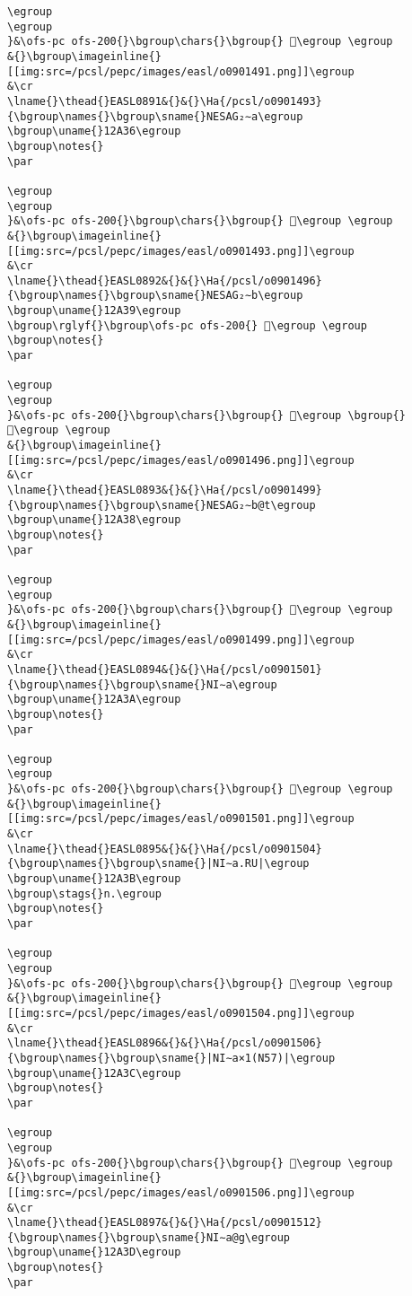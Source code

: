 \begin{verbatim}
\egroup
\egroup
}&\ofs-pc ofs-200{}\bgroup\chars{}\bgroup{} 𒨵\egroup \egroup
&{}\bgroup\imageinline{}[[img:src=/pcsl/pepc/images/easl/o0901491.png]]\egroup
&\cr
\lname{}\thead{}EASL0891&{}&{}\Ha{/pcsl/o0901493}{\bgroup\names{}\bgroup\sname{}NESAG₂∼a\egroup
\bgroup\uname{}12A36\egroup
\bgroup\notes{}
\par 

\egroup
\egroup
}&\ofs-pc ofs-200{}\bgroup\chars{}\bgroup{} 𒨶\egroup \egroup
&{}\bgroup\imageinline{}[[img:src=/pcsl/pepc/images/easl/o0901493.png]]\egroup
&\cr
\lname{}\thead{}EASL0892&{}&{}\Ha{/pcsl/o0901496}{\bgroup\names{}\bgroup\sname{}NESAG₂∼b\egroup
\bgroup\uname{}12A39\egroup
\bgroup\rglyf{}\bgroup\ofs-pc ofs-200{} 𒨹\egroup \egroup
\bgroup\notes{}
\par 

\egroup
\egroup
}&\ofs-pc ofs-200{}\bgroup\chars{}\bgroup{} 𒨷\egroup \bgroup{} 𒨹\egroup \egroup
&{}\bgroup\imageinline{}[[img:src=/pcsl/pepc/images/easl/o0901496.png]]\egroup
&\cr
\lname{}\thead{}EASL0893&{}&{}\Ha{/pcsl/o0901499}{\bgroup\names{}\bgroup\sname{}NESAG₂∼b@t\egroup
\bgroup\uname{}12A38\egroup
\bgroup\notes{}
\par 

\egroup
\egroup
}&\ofs-pc ofs-200{}\bgroup\chars{}\bgroup{} 𒨸\egroup \egroup
&{}\bgroup\imageinline{}[[img:src=/pcsl/pepc/images/easl/o0901499.png]]\egroup
&\cr
\lname{}\thead{}EASL0894&{}&{}\Ha{/pcsl/o0901501}{\bgroup\names{}\bgroup\sname{}NI∼a\egroup
\bgroup\uname{}12A3A\egroup
\bgroup\notes{}
\par 

\egroup
\egroup
}&\ofs-pc ofs-200{}\bgroup\chars{}\bgroup{} 𒨺\egroup \egroup
&{}\bgroup\imageinline{}[[img:src=/pcsl/pepc/images/easl/o0901501.png]]\egroup
&\cr
\lname{}\thead{}EASL0895&{}&{}\Ha{/pcsl/o0901504}{\bgroup\names{}\bgroup\sname{}|NI∼a.RU|\egroup
\bgroup\uname{}12A3B\egroup
\bgroup\stags{}n.\egroup
\bgroup\notes{}
\par 

\egroup
\egroup
}&\ofs-pc ofs-200{}\bgroup\chars{}\bgroup{} 𒨻\egroup \egroup
&{}\bgroup\imageinline{}[[img:src=/pcsl/pepc/images/easl/o0901504.png]]\egroup
&\cr
\lname{}\thead{}EASL0896&{}&{}\Ha{/pcsl/o0901506}{\bgroup\names{}\bgroup\sname{}|NI∼a×1(N57)|\egroup
\bgroup\uname{}12A3C\egroup
\bgroup\notes{}
\par 

\egroup
\egroup
}&\ofs-pc ofs-200{}\bgroup\chars{}\bgroup{} 𒨼\egroup \egroup
&{}\bgroup\imageinline{}[[img:src=/pcsl/pepc/images/easl/o0901506.png]]\egroup
&\cr
\lname{}\thead{}EASL0897&{}&{}\Ha{/pcsl/o0901512}{\bgroup\names{}\bgroup\sname{}NI∼a@g\egroup
\bgroup\uname{}12A3D\egroup
\bgroup\notes{}
\par 


\end{verbatim}

